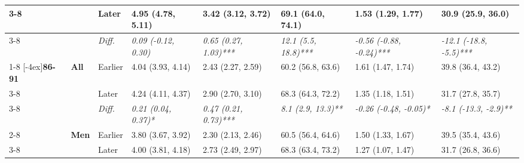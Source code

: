 \documentclass[12pt, a4paper]{article}
\begin{document}
\begin{appendices}
\begin{table}[!p]
{\begin{tabular}[t]{>{}l>{}lllllll}
        \cmidrule{3-8}
                                              &                                 & Later                         & 4.95 (4.78, 5.11)                           & 3.42 (3.12, 3.72)                            & 69.1 (64.0, 74.1)                           & 1.53 (1.29, 1.77)                               & 30.9 (25.9, 36.0)                              \\
        \cmidrule{3-8}
                                              &                                 & \cellcolor{gray!10}\em{Diff.} & \cellcolor{gray!10}\em{0.09 (-0.12, 0.30)}  & \cellcolor{gray!10}\em{0.65 (0.27, 1.03)***} & \cellcolor{gray!10}\em{12.1 (5.5, 18.8)***} & \cellcolor{gray!10}\em{-0.56 (-0.88, -0.24)***} & \cellcolor{gray!10}\em{-12.1 (-18.8, -5.5)***} \\
        \cmidrule{1-8}
        \multirow{9}{*}[-4ex]{\textbf{86-91}} & \multirow{3}{*}{\textbf{All}}   & Earlier                       & 4.04 (3.93, 4.14)                           & 2.43 (2.27, 2.59)                            & 60.2 (56.8, 63.6)                           & 1.61 (1.47, 1.74)                               & 39.8 (36.4, 43.2)                              \\
        \cmidrule{3-8}
                                              &                                 & Later                         & 4.24 (4.11, 4.37)                           & 2.90 (2.70, 3.10)                            & 68.3 (64.3, 72.2)                           & 1.35 (1.18, 1.51)                               & 31.7 (27.8, 35.7)                              \\
        \cmidrule{3-8}
                                              &                                 & \cellcolor{gray!10}\em{Diff.} & \cellcolor{gray!10}\em{0.21 (0.04, 0.37)*}  & \cellcolor{gray!10}\em{0.47 (0.21, 0.73)***} & \cellcolor{gray!10}\em{8.1 (2.9, 13.3)**}   & \cellcolor{gray!10}\em{-0.26 (-0.48, -0.05)*}   & \cellcolor{gray!10}\em{-8.1 (-13.3, -2.9)**}   \\
        \cmidrule{2-8}
                                              & \multirow{3}{*}{\textbf{Men}}   & Earlier                       & 3.80 (3.67, 3.92)                           & 2.30 (2.13, 2.46)                            & 60.5 (56.4, 64.6)                           & 1.50 (1.33, 1.67)                               & 39.5 (35.4, 43.6)                              \\
        \cmidrule{3-8}
                                              &                                 & Later                         & 4.00 (3.81, 4.18)                           & 2.73 (2.49, 2.97)                            & 68.3 (63.4, 73.2)                           & 1.27 (1.07, 1.47)                               & 31.7 (26.8, 36.6)                              \\

\end{tabular}}
\end{table}
\end{appendices}
\end{document}
